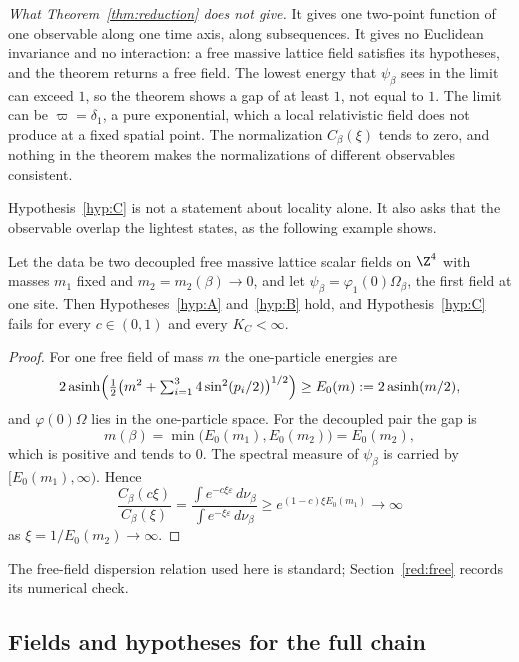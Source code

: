 \emph{What Theorem~\ref{thm:reduction} does not give.} It gives one two-point function of one observable along one time axis, along subsequences. It gives no Euclidean invariance and no interaction: a free massive lattice field satisfies its hypotheses, and the theorem returns a free field. The lowest energy that $\psi_\beta$ sees in the limit can exceed $1$, so the theorem shows a gap of at least $1$, not equal to $1$. The limit can be $\varpi=\delta_1$, a pure exponential, which a local relativistic field does not produce at a fixed spatial point. The normalization $C_\beta(\xi)$ tends to zero, and nothing in the theorem makes the normalizations of different observables consistent.

Hypothesis~\ref{hyp:C} is not a statement about locality alone. It also asks that the observable overlap the lightest states, as the following example shows.

\begin{observation}\label{red:twomass}
Let the data be two decoupled free massive lattice scalar fields on $\Z^4$ with masses $m_1$ fixed and $m_2=m_2(\beta)\to0$, and let $\psi_\beta=\varphi_1(0)\Omega_\beta$, the first field at one site. Then Hypotheses~\ref{hyp:A} and~\ref{hyp:B} hold, and Hypothesis~\ref{hyp:C} fails for every $c\in(0,1)$ and every $K_C<\infty$.
\end{observation}

\begin{proof}
For one free field of mass $m$ the one-particle energies are
\[
2\operatorname{asinh}\Bigl(\tfrac12\bigl(m^2+\textstyle\sum_{i=1}^3 4\sin^2(p_i/2)\bigr)^{1/2}\Bigr)\ge E_0(m):=2\operatorname{asinh}(m/2),
\]
and $\varphi(0)\Omega$ lies in the one-particle space. For the decoupled pair the gap is
\[
m(\beta)=\min\bigl(E_0(m_1),E_0(m_2)\bigr)=E_0(m_2),
\]
which is positive and tends to $0$. The spectral measure of $\psi_\beta$ is carried by $[E_0(m_1),\infty)$. Hence
\[
  \frac{C_\beta(c\xi)}{C_\beta(\xi)}=\frac{\int e^{-c\xi\varepsilon}\,d\nu_\beta}{\int e^{-\xi\varepsilon}\,d\nu_\beta}\ge e^{(1-c)\xi E_0(m_1)}\to\infty
\]
as $\xi=1/E_0(m_2)\to\infty$.
\end{proof}

The free-field dispersion relation used here is standard; Section~\ref{red:free} records its numerical check.

\subsection{Fields and hypotheses for the full chain}\label{red:S-setting}

